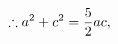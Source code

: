 \documentclass[preview]{standalone}
\begin{document}
\begin{align*}
\special{dvisvgm:raw <g id='unique000'>}\therefore a^2+c^2=\frac{5}{2}ac,\special{dvisvgm:raw </g>}
\end{align*}
\end{document}

